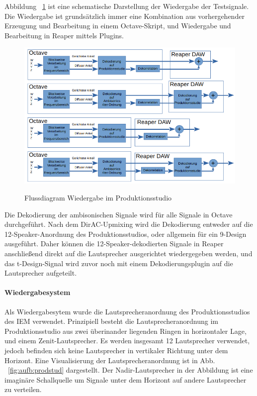 Abbildung ~\ref{fig:algos} ist eine schematische Darstellung der Wiedergabe der Testsignale. Die Wiedergabe ist grundsätzlich immer eine Kombination aus vorhergehender Erzeugung und Bearbeitung in einem Octave-Skript, und Wiedergabe und Bearbeitung in Reaper mittels Plugins.

\begin{figure}[!ht]
  \centering
  \includegraphics[width=1\textwidth]{aufbau/plots/algos.png}
  \label{fig:algos}
  \caption{Flussdiagram Wiedergabe im Produktionsstudio}
\end{figure}

Die Dekodierung der ambisonischen Signale wird für alle Signale in Octave durchgeführt. Nach dem DirAC-Upmixing wird die Dekodierung entweder auf die 12-Speaker-Anordnung des Produktionsstudios, oder allgemein für ein 9-Design ausgeführt. Daher können die 12-Speaker-dekodierten Signale in Reaper anschließend direkt auf die Lautsprecher ausgerichtet wiedergegeben werden, und das t-Design-Signal wird zuvor noch mit einem Dekodierungsplugin auf die Lautsprecher aufgeteilt.

\paragraph{Wiedergabesystem}
Als Wiedergabesytem wurde die Lautsprecheranordnung des Produktionsstudios des IEM verwendet. Prinzipiell besteht die Lautsprecheranordnung im Produktionsstudio aus zwei überinander liegenden Ringen in horizontaler Lage, und einem Zenit-Lautsprecher. Es werden insgesamt 12 Lautsprecher verwendet, jedoch befinden sich keine Lautsprecher in vertikaler Richtung unter dem Horizont. Eine Visualisierung der Lautsprecheranordnung ist in Abb. ~\ref{fig:aufb:prodstud} dargestellt. Der Nadir-Lautsprecher in der Abbildung ist eine imaginäre Schallquelle um Signale unter dem Horizont auf andere Lautsprecher zu verteilen.


